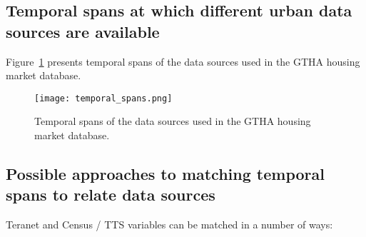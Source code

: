\subsection{Temporal spans at which different urban data sources are available} \label{subsec:temporal_scales}

Figure~\ref{fig:temporal_spans} presents temporal spans of the data sources used in the GTHA housing market database.
\begin{figure}[hbt!]
    \centering
    \texttt{[image: temporal\_spans.png]}
    \caption{Temporal spans of the data sources used in the GTHA housing market database.}
    \label{fig:temporal_spans}
\end{figure}

\subsection{Possible approaches to matching temporal spans to relate data sources} \label{subsec:possible_approaches_to_match_temporal_spans}

Teranet and Census / TTS variables can be matched in a number of ways:

